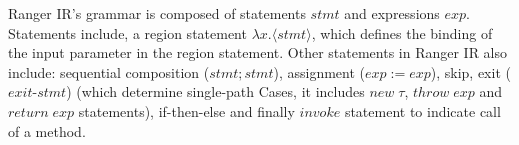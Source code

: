 Ranger IR's grammar is composed of statements $stmt$ and
expressions $exp$. Statements include, a region statement $\lambda x.\langle stmt \rangle$, which defines the binding of the input parameter in the region statement. Other statements in Ranger IR also include: sequential composition ($stmt ; stmt$), assignment ($exp := exp$),
skip, exit ($exit\text{-}stmt$) (which determine single-path Cases, it includes $new\; \tau$, $throw\; exp$ and $return\; exp$ statements), if-then-else and finally $invoke$ statement to indicate call of a method.

%
%


